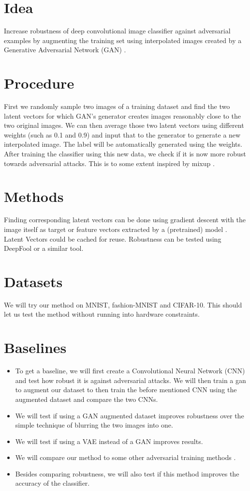 \documentclass{article}
\begin{document}
	\section{Idea}
	Increase robustness of deep convolutional image classifier against adversarial examples \cite{advExamples} by augmenting the training set using interpolated images created by a Generative Adversarial Network (GAN) \cite{gan}.
	
	\section{Procedure}
	First we randomly sample two images of a training dataset and find the two latent vectors for which GAN's generator creates images reasonably close to the two original images. We can then average those two latent vectors using different weights (such as 0.1 and 0.9) and input that to the generator to generate a new interpolated image. The label will be automatically generated using the weights. After training the classifier using this new data, we check if it is now more robust towards adversarial attacks. This is to some extent inspired by mixup \cite{mixup2}\cite{mixup1}.  
	
	\section{Methods}
	Finding corresponding latent vectors can be done using gradient descent with the image itself as target \cite{latentVector} or feature vectors extracted by a (pretrained) model \cite{ytLatentVector}. Latent Vectors could be cached for reuse.
	Robustness can be tested using DeepFool \cite{deepFool} or a similar tool.
	
	\section{Datasets}
	We will try our method on MNIST, fashion-MNIST and CIFAR-10. This should let us test the method without running into hardware constraints.
	
	\section{Baselines}
	\begin{itemize}
		\item To get a baseline, we will first create a Convolutional Neural Network (CNN) and test how robust it is against adversarial attacks. We will then train a gan to augment our dataset to then train the before mentioned CNN using the augmented dataset and compare the two CNNs.
		\item We will test if using a GAN augmented dataset improves robustness over the simple technique of blurring the two images into one.
		\item We will test if using a VAE instead of a GAN improves results.
		\item We will compare our method to some other adversarial training methods \cite{adv}\cite{gat}.
		\item Besides comparing robustness, we will also test if this method improves the accuracy of the classifier.
	\end{itemize}
	
	
	
\end{document}

